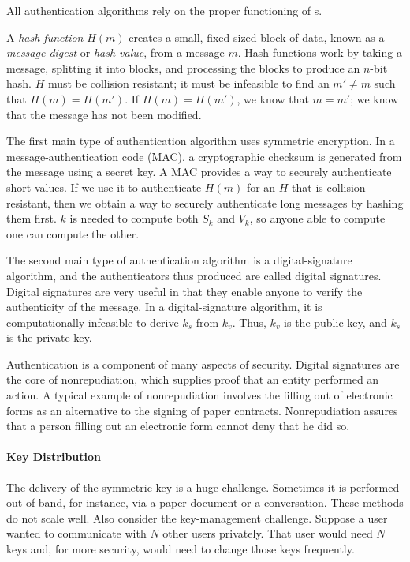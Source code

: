 All authentication algorithms rely on the proper functioning of s.
\begin{definition}\label{def:Hash_Function}
  A \emph{hash function} $H(m)$ creates a small, fixed-sized block of data, known as a \emph{message digest} or \emph{hash value}, from a message $m$.
  Hash functions work by taking a message, splitting it into blocks, and processing the blocks to produce an $n$-bit hash.
  $H$ must be collision resistant; it must be infeasible to find an $m' \neq m$ such that $H(m) = H(m')$.
  If $H(m) = H(m')$, we know that $m = m'$; we know that the message has not been modified.
\end{definition}

The first main type of authentication algorithm uses symmetric encryption.
In a message-authentication code (MAC), a cryptographic checksum is generated from the message using a secret key.
A MAC provides a way to securely authenticate short values.
If we use it to authenticate $H(m)$ for an $H$ that is collision resistant, then we obtain a way to securely authenticate long messages by hashing them first.
$k$ is needed to compute both $S_{k}$ and $V_{k}$, so anyone able to compute one can compute the other.

The second main type of authentication algorithm is a digital-signature algorithm, and the authenticators thus produced are called digital signatures.
Digital signatures are very useful in that they enable anyone to verify the authenticity of the message.
In a digital-signature algorithm, it is computationally infeasible to derive $k_{s}$ from $k_{v}$.
Thus, $k_{v}$ is the public key, and $k_{s}$ is the private key.

Authentication is a component of many aspects of security.
Digital signatures are the core of nonrepudiation, which supplies proof that an entity performed an action.
A typical example of nonrepudiation involves the filling out of electronic forms as an alternative to the signing of paper contracts.
Nonrepudiation assures that a person filling out an electronic form cannot deny that he did so.

\paragraph{Key Distribution}\label{par:Key_Distribution}
The delivery of the symmetric key is a huge challenge.
Sometimes it is performed out-of-band, for instance, via a paper document or a conversation.
These methods do not scale well.
Also consider the key-management challenge.
Suppose a user wanted to communicate with $N$ other users privately.
That user would need $N$ keys and, for more security, would need to change those keys frequently.

